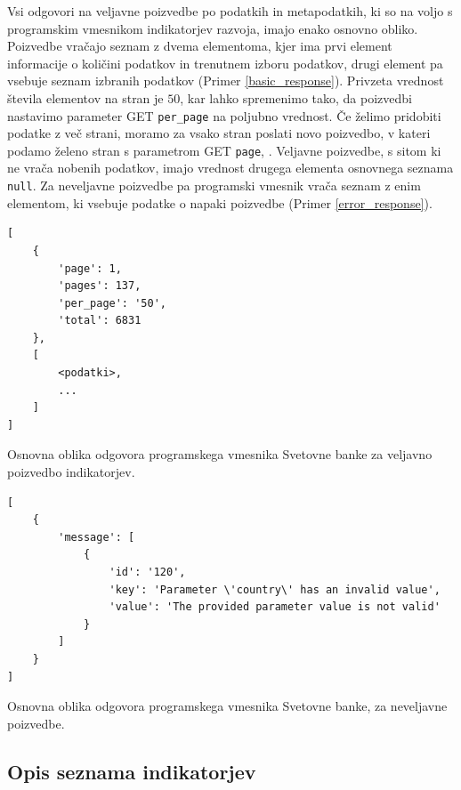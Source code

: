 Vsi odgovori na veljavne poizvedbe po podatkih in metapodatkih, ki so na voljo
s programskim vmesnikom indikatorjev razvoja, imajo enako osnovno obliko. 
Poizvedbe vračajo seznam z dvema elementoma, kjer ima prvi element 
informacije o količini podatkov in trenutnem izboru podatkov, drugi element 
pa vsebuje seznam izbranih podatkov (Primer \ref{basic_response}). Privzeta
vrednost števila elementov na stran je $50$, kar lahko spremenimo tako, da
poizvedbi nastavimo parameter GET \verb|per_page| na poljubno vrednost. Če
želimo pridobiti podatke z več strani, moramo za vsako stran poslati novo
poizvedbo, v kateri podamo želeno stran s parametrom GET \verb|page|, . 
Veljavne poizvedbe, s sitom ki ne vrača nobenih podatkov, imajo vrednost 
drugega elementa osnovnega seznama \verb|null|.
Za neveljavne poizvedbe pa programski vmesnik vrača seznam z enim elementom,
ki vsebuje podatke o napaki poizvedbe (Primer \ref{error_response}).


\begin{snippet}
\begin{center}
\begin{lstlisting}
[
    {
        'page': 1,
        'pages': 137,
        'per_page': '50',
        'total': 6831
    },
    [
        <podatki>,
        ...
    ]
]
\end{lstlisting}
\end{center}
\caption{Osnovna oblika odgovora programskega vmesnika Svetovne banke za
veljavno poizvedbo indikatorjev.} 
\label{basic_response}
\end{snippet} 


\begin{snippet}
\begin{center}
\begin{lstlisting}
[
    {
        'message': [
            {
                'id': '120',
                'key': 'Parameter \'country\' has an invalid value',
                'value': 'The provided parameter value is not valid'
            }
        ]
    }
]
\end{lstlisting}
\end{center}
\caption{Osnovna oblika odgovora programskega vmesnika Svetovne banke, za
neveljavne poizvedbe.}
\label{error_response}
\end{snippet} 


\subsection{Opis seznama indikatorjev}


